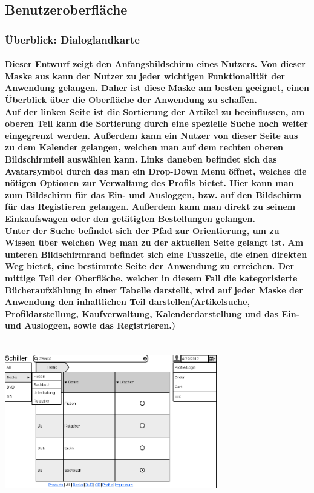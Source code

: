 \documentclass[a4paper]{article}
\begin{document}
\subsection{Benutzeroberfläche}

\subsubsection{Überblick: Dialoglandkarte}

\paragraph{Dieser Entwurf zeigt den Anfangsbildschirm eines Nutzers. Von dieser Maske aus kann der Nutzer zu jeder wichtigen Funktionalität der Anwendung gelangen. Daher ist diese Maske am besten geeignet, einen Überblick über die Oberfläche der Anwendung zu schaffen.\\
Auf der linken Seite ist die Sortierung der Artikel zu beeinflussen, am oberen Teil kann die Sortierung durch eine spezielle Suche noch weiter eingegrenzt werden. Außerdem kann ein Nutzer von dieser Seite aus zu dem Kalender gelangen, welchen man auf dem rechten oberen Bildschirmteil auswählen kann. Links daneben befindet sich das Avatarsymbol durch das man ein Drop-Down Menu öffnet, welches die nötigen Optionen zur Verwaltung des Profils bietet. Hier kann man zum Bildschirm für das Ein- und Ausloggen, bzw. auf den Bildschirm für das Registieren gelangen. Außerdem kann man direkt zu seinem Einkaufswagen oder den getätigten Bestellungen gelangen. \\
Unter der Suche befindet sich der Pfad zur Orientierung, um zu Wissen über welchen Weg man zu der aktuellen Seite gelangt ist.
Am unteren Bildschirmrand befindet sich eine Fusszeile, die einen direkten Weg bietet, eine bestimmte Seite der Anwendung zu erreichen.
Der mittige Teil der Oberfläche, welcher in diesem Fall die kategorisierte Bücheraufzählung in einer Tabelle darstellt, wird auf jeder Maske der Anwendung den inhaltlichen Teil darstellen(Artikelsuche, Profildarstellung, Kaufverwaltung, Kalenderdarstellung und das Ein- und Ausloggen, sowie das Registrieren.)\\ \\}
\includegraphics[width=350px]{1Home_Costumer.png}
\end{document}
